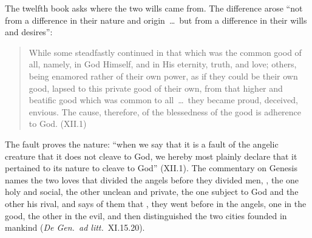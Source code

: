 The twelfth book asks where the two wills came from. The difference arose
``not from a difference in their nature and origin~\dots\ but from a
difference in their wills and desires'':
\begin{quote}
While some steadfastly continued in that which was the common good of
all, namely, in God Himself, and in His eternity, truth, and love; others,
being enamored rather of their own power, as if they could be their own
good, lapsed to this private good of their own, from that higher and
beatific good which was common to all~\dots\ they became proud,
deceived, envious. The cause, therefore, of the blessedness of the
good is adherence to God. (XII.1)
\end{quote}
The fault proves the nature: ``when we say that it is a fault of the
angelic creature that it does not cleave to God, we hereby most plainly
declare that it pertained to its nature to cleave to God'' (XII.1). The
commentary on Genesis names the two loves that divided the angels before
they divided men, , the one holy and social, the other unclean and
private, the one subject to God and the other his rival, and says of them
that ,
they went before in the angels, one in the good, the other in the evil,
and then distinguished the two cities founded in mankind (\emph{De Gen.\
ad litt.}\ XI.15.20).

